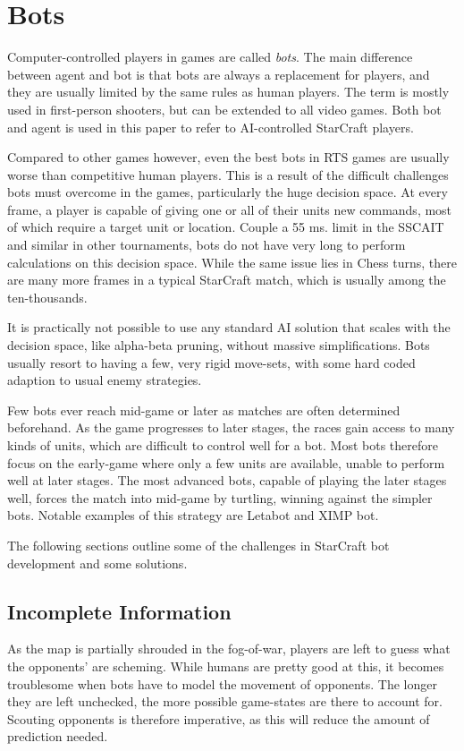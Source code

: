 \section{Bots}
Computer-controlled players in games are called \emph{bots}. The main difference between agent and bot is that bots are always a replacement for players, and they are usually limited by the same rules as human players. The term is mostly used in first-person shooters, but can be extended to all video games. Both bot and agent is used in this paper to refer to AI-controlled StarCraft players.

Compared to other games however, even the best bots in RTS games are usually worse than competitive human players. This is a result of the difficult challenges bots must overcome in the games, particularly the huge decision space. At every frame, a player is capable of giving one or all of their units new commands, most of which require a target unit or location. Couple a 55 ms. limit in the SSCAIT and similar in other tournaments, bots do not have very long to perform calculations on this decision space. While the same issue lies in Chess turns, there are many more frames in a typical StarCraft match, which is usually among the ten-thousands.

It is practically not possible to use any standard AI solution that scales with the decision space, like alpha-beta pruning, without massive simplifications. Bots usually resort to having a few, very rigid move-sets, with some hard coded adaption to usual enemy strategies.

Few bots ever reach mid-game or later as matches are often determined beforehand. As the game progresses to later stages, the races gain access to many kinds of units, which are difficult to control well for a bot. Most bots therefore focus on the early-game where only a few units are available, unable to perform well at later stages. The most advanced bots, capable of playing the later stages well, forces the match into mid-game by turtling, winning against the simpler bots. Notable examples of this strategy are Letabot and XIMP bot.

The following sections outline some of the challenges in StarCraft bot development and some solutions.

	\subsection*{Incomplete Information}
	As the map is partially shrouded in the fog-of-war, players are left to guess what the opponents' are scheming. While humans are pretty good at this, it becomes troublesome when bots have to model the movement of opponents. The longer they are left unchecked, the more possible game-states are there to account for. Scouting opponents is therefore imperative, as this will reduce the amount of prediction needed.
	
